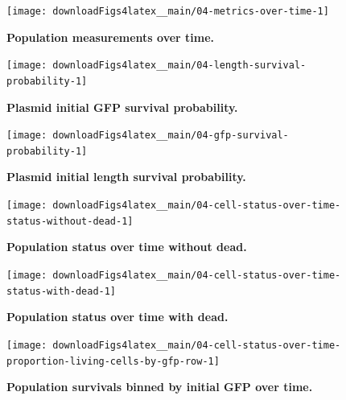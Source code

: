 \documentclass[a4paper, nobind]{templates/ociamthesis}
\begin{document}
\begin{figure}[H]
\texttt{[image: downloadFigs4latex\_\_main/04-metrics-over-time-1]} \caption[Population measurements over time.]{\textbf{Population measurements over time.}}\label{fig:04-metrics-over-time-1}
\end{figure}





\begin{figure}[H]
\texttt{[image: downloadFigs4latex\_\_main/04-length-survival-probability-1]} \caption[Plasmid initial GFP survival probability.]{\textbf{Plasmid initial GFP survival probability.}}\label{fig:04-length-survival-probability-1}
\end{figure}





\begin{figure}[H]
\texttt{[image: downloadFigs4latex\_\_main/04-gfp-survival-probability-1]} \caption[Plasmid initial length survival probability.]{\textbf{Plasmid initial length survival probability.}}\label{fig:04-gfp-survival-probability-1}
\end{figure}





\begin{figure}[H]
\texttt{[image: downloadFigs4latex\_\_main/04-cell-status-over-time-status-without-dead-1]} \caption[Population status over time without dead.]{\textbf{Population status over time without dead.}}\label{fig:04-cell-status-over-time-status-without-dead-1}
\end{figure}





\begin{figure}[H]
\texttt{[image: downloadFigs4latex\_\_main/04-cell-status-over-time-status-with-dead-1]} \caption[Population status over time with dead.]{\textbf{Population status over time with dead.}}\label{fig:04-cell-status-over-time-status-with-dead-1}
\end{figure}





\begin{figure}[H]
\texttt{[image: downloadFigs4latex\_\_main/04-cell-status-over-time-proportion-living-cells-by-gfp-row-1]} \caption[Population survivals binned by initial GFP over time.]{\textbf{Population survivals binned by initial GFP over time.}}\label{fig:04-cell-status-over-time-proportion-living-cells-by-gfp-row-1}
\end{figure}
\end{document}
